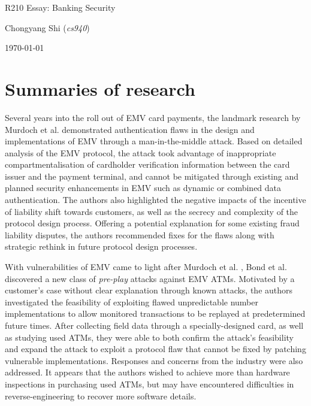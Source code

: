 \documentclass[11pt]{article}
\begin{document}
\centerline{\Large R210 Essay:  Banking Security}
\vspace{2em}
\centerline{\large Chongyang Shi (\emph{cs940})}
\vspace{1em}
\centerline{\large \today}
\vspace{1em}

\section{Summaries of research}

Several years into the roll out of EMV card payments, the landmark research by Murdoch et al. \cite{murdoch2010chip} demonstrated authentication flaws in the design and implementations of EMV through a man-in-the-middle attack. Based on detailed analysis of the EMV protocol, the attack took advantage of inappropriate compartmentalisation of cardholder verification information between the card issuer and the payment terminal, and cannot be mitigated through existing and planned security enhancements in EMV such as dynamic or combined data authentication. The authors also highlighted the negative impacts of the incentive of liability shift towards customers, as well as the secrecy and complexity of the protocol design process. Offering a potential explanation for some existing fraud liability disputes, the authors recommended fixes for the flaws along with strategic rethink in future protocol design processes.

With vulnerabilities of EMV came to light after Murdoch et al. \cite{murdoch2010chip}, Bond et al. \cite{bond2014chip} discovered a new class of \emph{pre-play} attacks against EMV ATMs. Motivated by a customer's case without clear explanation through known attacks, the authors investigated the feasibility of exploiting flawed unpredictable number implementations to allow monitored transactions to be replayed at predetermined future times. After collecting field data through a specially-designed card, as well as studying used ATMs, they were able to both confirm the attack's feasibility and expand the attack to exploit a protocol flaw that cannot be fixed by patching vulnerable implementations. Responses and concerns from the industry were also addressed. It appears that the authors wished to achieve more than hardware inspections in purchasing used ATMs, but may have encountered difficulties in reverse-engineering to recover more software details.
\end{document}
